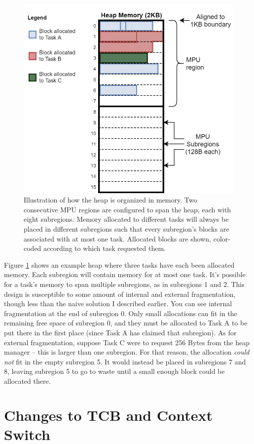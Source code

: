 \begin{figure}[hbtp]
	\centering
	\includegraphics[width=0.7\linewidth]{figs/heap_prot.png}
	\caption{Illustration of how the heap is organized in memory. Two consecutive MPU regions are configured to span the heap, each with eight subregions. Memory allocated to different tasks will always be placed in different subregions such that every subregion's blocks are associated with at most one task. Allocated blocks are shown, color-coded according to which task requested them.}
	\label{fig:heap_prot}
\end{figure}

Figure \ref{fig:heap_prot} shows an example heap where three tasks have each been allocated memory. Each subregion will contain memory for at most one task. It's possible for a task's memory to span multiple subregions, as in subregions 1 and 2. This design is susceptible to some amount of internal and external fragmentation, though less than the naive solution I described earlier. You can see internal fragmentation at the end of subregion 0. Only small allocations can fit in the remaining free space of subregion 0, and they must be allocated to Task A to be put there in the first place (since Task A has claimed that subregion). As for external fragmentation, suppose Task C were to request 256 Bytes from the heap manager -- this is larger than one subregion. For that reason, the allocation \textit{could not} fit in the empty subregion 5. It would instead be placed in subregions 7 and 8, leaving subregion 5 to go to waste until a small enough block could be allocated there.

\section{Changes to TCB and Context Switch}

